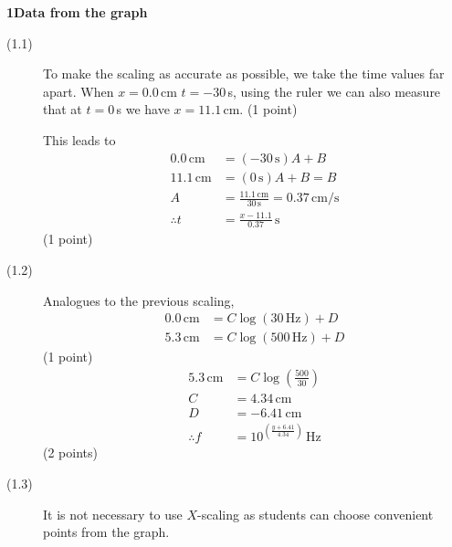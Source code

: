 \noindent\textbf{1\quad Data from the graph}
\begin{description}
\item[(1.1)] To make the scaling as accurate as possible, we take the time
  values far apart. When $x = 0.0$\,cm $t = -30$\,s, using the ruler we can
  also measure that at $t = 0$\,s we have $x = 11.1$\,cm. \hfill(1 point)

  This leads to
  \begin{align*}
    0.0\,\mathrm{cm} &= (-30\,\mathrm{s})A + B \\
    11.1\,\mathrm{cm} &= (0\,\mathrm{s})A + B = B \\
    A &= \frac{11.1\,\mathrm{cm}}{30\,\mathrm{s}} = 0.37\,\mathrm{cm/s} \\
    \therefore t &= \frac{x - 11.1}{0.37}\,\mathrm{s}
  \end{align*}
  \hfill(1 point)

\item[(1.2)] Analogues to the previous scaling,
  \begin{align*}
    0.0\,\mathrm{cm} &= C\log(30\,\mathrm{Hz}) + D \\
    5.3\,\mathrm{cm} &= C\log(500\,\mathrm{Hz}) + D
  \end{align*}
  \hfill(1 point)
  \begin{align*}
    5.3\,\mathrm{cm} &= C\log\left(\frac{500}{30}\right) \\
    C &= 4.34\,\mathrm{cm} \\
    D &= -6.41\,\mathrm{cm} \\
    \therefore f &= 10^{\left(\frac{y+6.41}{4.34}\right)}\,\mathrm{Hz}
  \end{align*}
  \hfill(2 points)

\item[(1.3)] It is not necessary to use $X$-scaling as students can choose
  convenient points from the graph.


\end{description}
